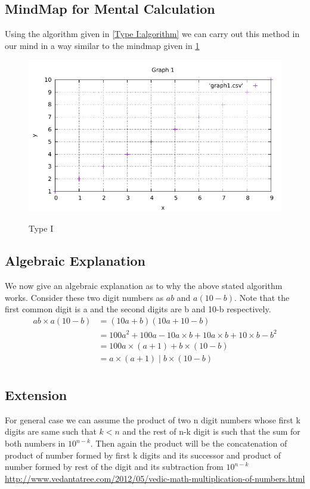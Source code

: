 \subsection{MindMap for Mental Calculation}
Using the algorithm given in \ref{Type I:algorithm} we can carry out this method in our mind in a way similar to the mindmap given in \ref{Figure1}

\begin{figure}[h]
	\label{Figure1}
	\centering
	\includegraphics[scale=1]{graph1.pdf} \\
	\caption{Type I}
\end{figure}
\newpage
\subsection{Algebraic Explanation}
We now give an algebraic explanation as to why the above stated algorithm works. Consider these two digit numbers as $ab$ and $a(10-b)$. Note that the first common digit is a and the second digits are b and 10-b respectively.
\begin{align*}
    ab  \times  a(10-b) & = ( 10a + b )( 10a + 10 - b ) \\
                 & = 100a^2 + 100a -10a \times b + 10a \times b + 10 \times b - b^2 \\
                 & = 100a \times (a+1) + b \times (10-b) \\
                 & = a \times (a+1) \; | \; b \times (10-b) \\
\end{align*}

\subsection{Extension}
For general case we can assume the product of two n digit numbers whose first k digits are same such that $k < n$ and the rest of n-k digit is such that the sum for both numbers in $ {10}^{n-k} $. Then again the product will be the concatenation of product of number formed by first k digits and its successor and product of number formed by rest of the digit and its subtraction from $ {10}^{n-k} $
\url {http://www.vedantatree.com/2012/05/vedic-math-multiplication-of-numbers.html}

